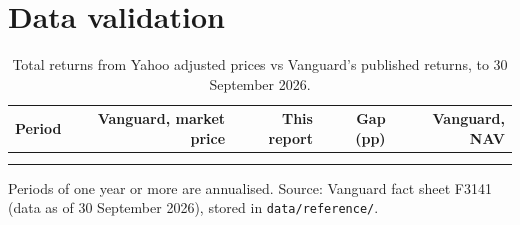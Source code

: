\documentclass[11pt,a4paper]{article}
\newcommand{\keep}[1]{\Needspace{#1\baselineskip}}
\newcommand{\note}[1]{{\footnotesize\color{muted}#1\par}}
\begin{document}
\keep{24}
\section{Data validation}
\begin{table}[H]
\small
\caption{Total returns from Yahoo adjusted prices vs Vanguard's published returns, to 30 September 2026.}
\begin{tabularx}{\linewidth}{L r r r r}
\toprule
\textbf{Period} & \textbf{Vanguard, market price} & \textbf{This report} & \textbf{Gap (pp)} & \textbf{Vanguard, NAV} \\
\midrule
{}
 &  &  &  &  \\
\bottomrule
\end{tabularx}
\end{table}
\note{Periods of one year or more are annualised. Source: Vanguard fact sheet F3141 (data as of 30 September 2026), stored in \texttt{data/reference/}.}


\keep{20}
\end{document}

